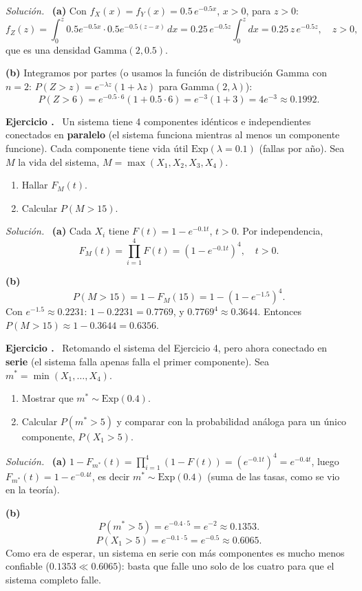\documentclass[11pt,a4paper]{article}
\newcounter{ejnum}
\newenvironment{ejercicio}{\refstepcounter{ejnum}\par\medskip\noindent\textbf{Ejercicio \theejnum.}~}{\par}
\newenvironment{solucion}{\par\noindent\textit{Solución.}~}{\par\vspace{1em}}
\begin{document}
\begin{solucion}
\textbf{(a)} Con $f_X(x)=f_Y(x)=0.5\,e^{-0.5x}$, $x>0$, para $z>0$:
\[
f_Z(z) = \int_0^z 0.5e^{-0.5x}\cdot 0.5e^{-0.5(z-x)}\,dx = 0.25\,e^{-0.5z}\int_0^z dx = 0.25\,z\,e^{-0.5z}, \quad z>0,
\]
que es una densidad $\text{Gamma}(2, 0.5)$.

\textbf{(b)} Integramos por partes (o usamos la función de distribución Gamma con $n=2$: $P(Z>z)=e^{-\lambda z}(1+\lambda z)$ para Gamma$(2,\lambda)$):
\[
P(Z>6) = e^{-0.5\cdot 6}\left(1+0.5\cdot 6\right) = e^{-3}(1+3) = 4e^{-3} \approx 0.1992.
\]
\end{solucion}

\begin{ejercicio}
Un sistema tiene 4 componentes idénticos e independientes conectados en \textbf{paralelo} (el sistema funciona mientras al menos un componente funcione). Cada componente tiene vida útil $\text{Exp}(\lambda=0.1)$ (fallas por año). Sea $M$ la vida del sistema, $M=\max(X_1,X_2,X_3,X_4)$.
\begin{enumerate}[label=(\alph*)]
\item Hallar $F_M(t)$.
\item Calcular $P(M>15)$.
\end{enumerate}
\end{ejercicio}

\begin{solucion}
\textbf{(a)} Cada $X_i$ tiene $F(t) = 1-e^{-0.1t}$, $t>0$. Por independencia,
\[
F_M(t) = \prod_{i=1}^4 F(t) = \left(1-e^{-0.1t}\right)^4, \quad t>0.
\]

\textbf{(b)}
\[
P(M>15) = 1-F_M(15) = 1-\left(1-e^{-1.5}\right)^4.
\]
Con $e^{-1.5}\approx 0.2231$: $1-0.2231 = 0.7769$, y $0.7769^4 \approx 0.3644$. Entonces $P(M>15) \approx 1-0.3644 = 0.6356$.
\end{solucion}

\begin{ejercicio}
Retomando el sistema del Ejercicio 4, pero ahora conectado en \textbf{serie} (el sistema falla apenas falla el primer componente). Sea $m^*=\min(X_1,\ldots,X_4)$.
\begin{enumerate}[label=(\alph*)]
\item Mostrar que $m^*\sim\text{Exp}(0.4)$.
\item Calcular $P(m^*>5)$ y comparar con la probabilidad análoga para un único componente, $P(X_1>5)$.
\end{enumerate}
\end{ejercicio}

\begin{solucion}
\textbf{(a)} $1-F_{m^*}(t) = \prod_{i=1}^4 (1-F(t)) = \left(e^{-0.1t}\right)^4 = e^{-0.4t}$, luego $F_{m^*}(t) = 1-e^{-0.4t}$, es decir $m^*\sim\text{Exp}(0.4)$ (suma de las tasas, como se vio en la teoría).

\textbf{(b)}
\[
P(m^*>5) = e^{-0.4\cdot5} = e^{-2} \approx 0.1353.
\]
\[
P(X_1>5) = e^{-0.1\cdot5} = e^{-0.5} \approx 0.6065.
\]
Como era de esperar, un sistema en serie con más componentes es mucho menos confiable ($0.1353 \ll 0.6065$): basta que falle uno solo de los cuatro para que el sistema completo falle.
\end{solucion}
\end{document}
